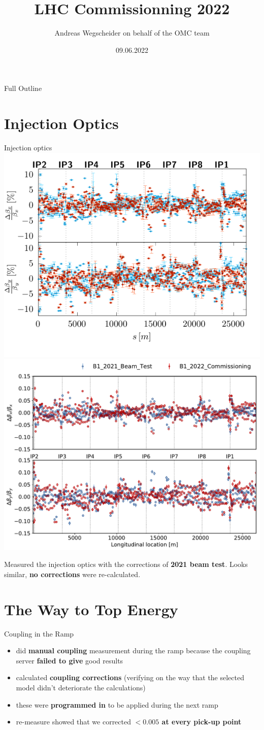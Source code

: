\documentclass[11pt,usenames,dvipsnames]{beamer}
\author[OMC]{Andreas Wegscheider on behalf of the OMC team}
\title[LHC 2022]{LHC Commissionning 2022}
\institute{CERN}
\date[09.06.22]{09.06.2022}
\newcommand{\highl}[1]{\textbf{#1}}
\begin{document}


\begin{frame}
    \titlepage
\end{frame}


\begin{frame}{Full Outline}
\tableofcontents
\end{frame}
\small

\section{Injection Optics}
\begin{frame}{Injection optics}
    \includegraphics[width=0.49\linewidth]{images/beamtest/b1_bb.pdf}
    \hfill
    \includegraphics[width=0.49\linewidth]{images/beamtest/lhcb1_betabeat_vs_beamtest.pdf}
    
    Measured the injection optics with the corrections of \highl{2021 beam test}.
    Looks similar, \highl{no corrections} were re-calculated.
\end{frame}

\section{The Way to Top Energy}

\begin{frame}{Coupling in the Ramp}
\begin{itemize}
    \item %
did \highl{manual coupling} measurement during the ramp because the coupling server
\highl{failed to give} good results 
    \item %
calculated \highl{coupling corrections} (verifying on the way that the selected model didn't deteriorate the calculations)
    \item %
these were \highl{programmed in} to be applied during the next ramp
    \item %
re-measure showed that we corrected \highl{$< 0.005$ at every pick-up point}
\end{itemize}
\end{frame}
\end{document}
